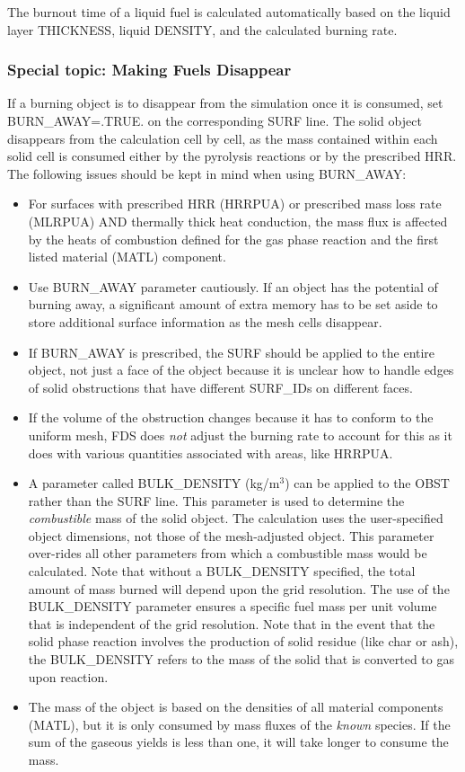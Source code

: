 \documentclass[11pt]{book}
\begin{document}
The burnout time of a liquid fuel is calculated automatically based on the liquid layer {\ct THICKNESS}, liquid {\ct DENSITY}, and the calculated burning rate.


\subsubsection{Special topic: Making Fuels Disappear}
\label{info:BURN_AWAY}

If a burning object is to disappear from the simulation once it is consumed, set {\ct BURN\_AWAY=.TRUE.} on the corresponding {\ct SURF} line. The solid object disappears from the calculation cell by cell, as the mass contained within each solid cell is consumed either by the pyrolysis reactions or by the prescribed HRR. The following issues should be kept in mind when using {\ct BURN\_AWAY}:
\begin{itemize}
\item For surfaces with prescribed HRR ({\ct HRRPUA}) or prescribed mass loss rate ({\ct MLRPUA}) AND thermally thick heat conduction, the mass flux is affected by the heats of combustion defined for the gas phase reaction and the first listed material ({\ct MATL}) component.
\item Use {\ct BURN\_AWAY} parameter cautiously. If an object has the potential of burning away, a significant amount of extra memory has to be set aside to store additional surface information as the mesh cells disappear.
\item If {\ct BURN\_AWAY} is prescribed, the {\ct SURF} should be applied to the entire object, not just a face of the object because it is unclear how to handle edges of solid obstructions that have different {\ct SURF\_ID}s on different faces.
\item If the volume of the obstruction changes because it has to conform to the uniform mesh, FDS does {\em not} adjust the burning rate to account for this as it does with various quantities associated with areas, like {\ct HRRPUA}.
\item A parameter called {\ct BULK\_DENSITY} (kg/m$^3$) can be applied to the {\ct OBST} rather than the {\ct SURF} line. This parameter is used to determine the {\em combustible} mass of the solid object. The calculation uses the user-specified object dimensions, not those of the mesh-adjusted object. This parameter over-rides all other parameters from which a combustible mass would be calculated. Note that without a {\ct BULK\_DENSITY} specified, the total amount of mass burned will depend upon the grid resolution. The use of the {\ct BULK\_DENSITY} parameter ensures a specific fuel mass per unit volume that is independent of the grid resolution. Note that in the event that the solid phase reaction involves the production of solid residue (like char or ash), the {\ct BULK\_DENSITY} refers to the mass of the solid that is converted to gas upon reaction.
\item The mass of the object is based on the densities of all material components ({\ct MATL}), but it is only consumed by mass fluxes of the {\em known} species. If the sum of the gaseous yields is less than one, it will take longer to consume the mass.
\end{itemize}
\end{document}
